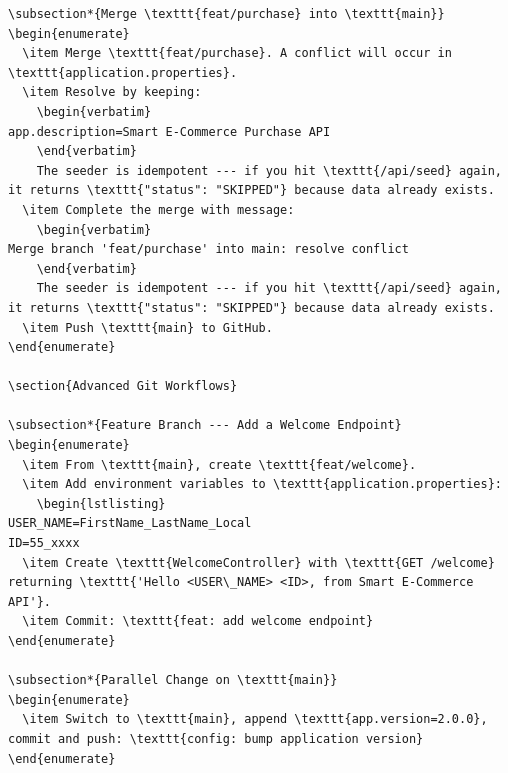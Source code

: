 \documentclass[a4paper]{article}
\begin{document}
\begin{enumerate}
\begin{lstlisting}
\subsection*{Merge \texttt{feat/purchase} into \texttt{main}}
\begin{enumerate}
  \item Merge \texttt{feat/purchase}. A conflict will occur in \texttt{application.properties}.
  \item Resolve by keeping:
    \begin{verbatim}
app.description=Smart E-Commerce Purchase API
    \end{verbatim}
    The seeder is idempotent --- if you hit \texttt{/api/seed} again, it returns \texttt{"status": "SKIPPED"} because data already exists.
  \item Complete the merge with message:
    \begin{verbatim}
Merge branch 'feat/purchase' into main: resolve conflict
    \end{verbatim}
    The seeder is idempotent --- if you hit \texttt{/api/seed} again, it returns \texttt{"status": "SKIPPED"} because data already exists.
  \item Push \texttt{main} to GitHub.
\end{enumerate}

\section{Advanced Git Workflows}

\subsection*{Feature Branch --- Add a Welcome Endpoint}
\begin{enumerate}
  \item From \texttt{main}, create \texttt{feat/welcome}.
  \item Add environment variables to \texttt{application.properties}:
    \begin{lstlisting}
USER_NAME=FirstName_LastName_Local
ID=55_xxxx
  \item Create \texttt{WelcomeController} with \texttt{GET /welcome} returning \texttt{'Hello <USER\_NAME> <ID>, from Smart E-Commerce API'}.
  \item Commit: \texttt{feat: add welcome endpoint}
\end{enumerate}

\subsection*{Parallel Change on \texttt{main}}
\begin{enumerate}
  \item Switch to \texttt{main}, append \texttt{app.version=2.0.0}, commit and push: \texttt{config: bump application version}
\end{enumerate}


\end{lstlisting}
\end{enumerate}
\end{document}
